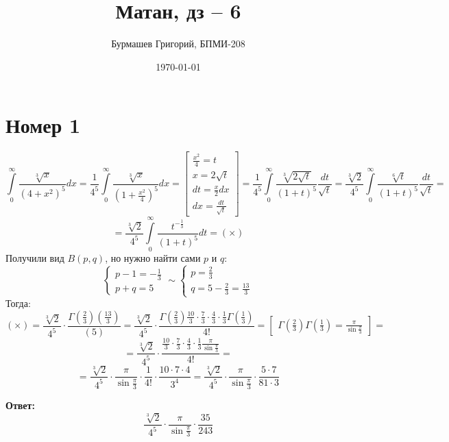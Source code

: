 \documentclass[a4paper,12pt]{article}
\author{Бурмашев Григорий, БПМИ-208}
\title{Матан, дз -- 6}
\date{\today}
\begin{document}
\maketitle
\section*{Номер 1}
\[
\int\limits_0^{\infty} \frac{\sqrt[3]{x}}{(4 + x^2)^5} dx
=
\frac{1}{4^5 }
\int\limits_0^{\infty} \frac{\sqrt[3]{x}}{(1 + \frac{x^2}{4})^5} dx
=
\begin{bmatrix}
\frac{x^2}{4} = t \\ 
x = 2\sqrt{t} \\ 
dt = \frac{x}{2} dx \\
dx = \frac{dt}{\sqrt{t}}
\end{bmatrix}
=
\frac{1}{4^5 }
\int\limits_0^{\infty}
\frac{\sqrt[3]{2\sqrt{t}}}{(1 + t)^5}
\frac{dt}{\sqrt{t}}
=
\frac{\sqrt[3]{2} }{4^5 }
\int\limits_0^{\infty}
\frac{\sqrt[6]{t}}{(1 + t)^5} \frac{dt}{\sqrt{t}}
=
\]
\[
=
\frac{\sqrt[3]{2} }{4^5 }
\int\limits_0^{\infty}
\frac{t^{-\frac{1}{3}}}{(1 + t)^5} dt = (\times)
\]
Получили вид $B(p, q)$, но нужно найти сами $p$ и $q$:
\[
\begin{cases}
p - 1 = -\frac{1}{3} \\
p + q = 5
\end{cases}
\sim 
\begin{cases}
p  = \frac{2}{3} \\
q = 5 - \frac{2}{3} = \frac{13}{3}
\end{cases}
\]
Тогда:
\[
(\times) = \frac{\sqrt[3]{2} }{4^5 } \cdot \frac{\Gamma \left(\frac{2}{3}\right)\left(\frac{13}{3}\right)}{\left(5\right)}
=
 \frac{\sqrt[3]{2} }{4^5 } \cdot \frac{\Gamma \left(\frac{2}{3}\right)
\frac{10}{3} \cdot \frac{7}{3} \cdot \frac{4}{3} \cdot \frac{1}{3}\Gamma \left(\frac{1}{3}\right)}
{4!}
= 
\begin{bmatrix}
\Gamma \left(\frac{2}{3}\right)\Gamma \left(\frac{1}{3}\right)= \frac{\pi}{\sin \frac{\pi}{3}}
\end{bmatrix}
=
\]
\[
=
\frac{\sqrt[3]{2} }{4^5 } \cdot 
\frac{
\frac{10}{3} \cdot \frac{7}{3} \cdot \frac{4}{3} \cdot \frac{1}{3} \frac{\pi}{\sin \frac{\pi}{3}}}{4!}
=
\]
\[
=
\frac{\sqrt[3]{2} }{4^5 } \cdot \frac{\pi}{\sin \frac{\pi}{3}} \cdot \frac{1}{4!} 
\cdot \frac{10 \cdot 7 \cdot 4}{3^4}  = \frac{\sqrt[3]{2} }{4^5 } \cdot \frac{\pi}{\sin \frac{\pi}{3}}
\cdot \frac{5 \cdot 7}{81 \cdot 3} 
\]
\begin{center}
\textbf{Ответ: } 
\[
\frac{\sqrt[3]{2} }{4^5 } \cdot \frac{\pi}{\sin \frac{\pi}{3}}
\cdot \frac{35}{243} 
\]
\end{center}
\clearpage
\end{document}
